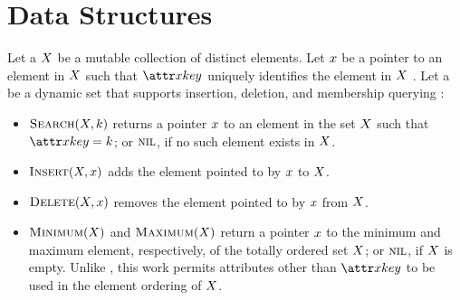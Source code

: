 \chapter{Data Structures}\label{ch:data-structures}

\newcommand{\vKey}{k}
\newcommand{\aSomeElementKey}{\aKey{\vSomeElement}}

Let a  $X$ be a mutable collection of distinct elements. Let $x$ be a pointer to an element in $X$ such that $\aSomeElementKey$ uniquely identifies the element in $X$ \citep{Cormen2022}. Let a  be a dynamic set that supports insertion, deletion, and membership querying \citep{Cormen2022}:
%
\begin{itemize}
    \item $\cSearch[\vSomeSet, \vKey]$ returns a pointer $x$ to an element in the set $X$ such that $\aSomeElementKey \equals \vKey$; or $\textsc{nil}$, if no such element exists in $X$.
    \item $\cInsert[\vSomeSet, \vSomeElement]$ adds the element pointed to by $x$ to $X$.
    \item $\cDelete[\vSomeSet, \vSomeElement]$ removes the element pointed to by $x$ from $X$.
    \item $\cMinimum[\vSomeSet]$ and $\cMaximum[\vSomeSet]$ return a pointer $x$ to the minimum and maximum element, respectively, of the totally ordered set $X$; or $\textsc{nil}$, if $X$ is empty. Unlike \citet{Cormen2022}, this work permits attributes other than $\aSomeElementKey$ to be used in the element ordering of $X$.
\end{itemize}
